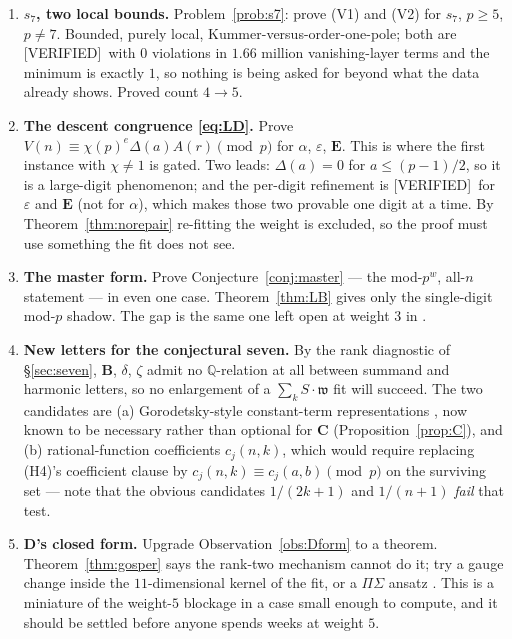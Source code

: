 \documentclass[11pt,reqno]{amsart}
\theoremstyle{plain}
\theoremstyle{definition}
\theoremstyle{remark}
\newcommand{\Q}{\mathbb{Q}}
\newcommand{\Verified}{\textup{\textsf{[VERIFIED]}}}
\numberwithin{equation}{section}
\begin{document}
\begin{enumerate}[leftmargin=2em,label=\textbf{P\arabic*.}]
\item \textbf{$s_7$, two local bounds.} Problem~\ref{prob:s7}: prove (V1) and (V2) for
  $s_7$, $p\ge5$, $p\ne7$. Bounded, purely local, Kummer-versus-order-one-pole; both are
  \Verified\ with $0$ violations in $1.66$ million vanishing-layer terms and the minimum is
  exactly $1$, so nothing is being asked for beyond what the data already shows. Proved
  count $4\to5$.
\item \textbf{The descent congruence \eqref{eq:LD}.} Prove
  $V(n)\equiv\chi(p)^{e}\Delta(a)A(r)\pmod p$ for $\alpha$, $\varepsilon$, $\mathbf E$. This
  is where the first instance with $\chi\ne1$ is gated. Two leads: $\Delta(a)=0$ for
  $a\le(p-1)/2$, so it is a large-digit phenomenon; and the per-digit refinement is
  \Verified\ for $\varepsilon$ and $\mathbf E$ (not for $\alpha$), which makes those two
  provable one digit at a time. By Theorem~\ref{thm:norepair} re-fitting the weight is
  excluded, so the proof must use something the fit does not see.
\item \textbf{The master form.} Prove Conjecture~\ref{conj:master} --- the mod-$p^w$,
  all-$n$ statement --- in even one case. Theorem~\ref{thm:LB} gives only the single-digit
  mod-$p$ shadow. The gap is the same one left open at weight $3$ in
  \cite{CompanionLucas2nd}.
\item \textbf{New letters for the conjectural seven.} By the rank diagnostic of
  \S\ref{sec:seven}, $\mathbf B$, $\delta$, $\zeta$ admit no $\Q$-relation at all between
  summand and harmonic letters, so no enlargement of a $\sum_kS\cdot\mathfrak w$ fit will
  succeed. The two candidates are (a) Gorodetsky-style constant-term representations
  \cite{Gorodetsky}, now known to be necessary rather than optional for $\mathbf C$
  (Proposition~\ref{prop:C}), and (b) rational-function coefficients $c_j(n,k)$, which would
  require replacing (H4)'s coefficient clause by $c_j(n,k)\equiv c_j(a,b)\pmod p$ on the
  surviving set --- note that the obvious candidates $1/(2k+1)$ and $1/(n+1)$ \emph{fail}
  that test.
\item \textbf{$\mathbf D$'s closed form.} Upgrade Observation~\ref{obs:Dform} to a theorem.
  Theorem~\ref{thm:gosper} says the rank-two mechanism cannot do it; try a gauge change
  inside the $11$-dimensional kernel of the fit, or a $\Pi\Sigma$ ansatz
  \cite{Schneider2007}. This is a miniature of the weight-$5$ blockage in a case small
  enough to compute, and it should be settled before anyone spends weeks at weight $5$.

\end{enumerate}
\end{document}
